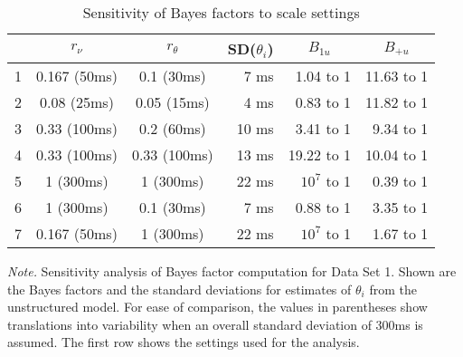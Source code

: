 \documentclass[american,man]{apa6}
\begin{document}
\begin{table}[tbp]
\begin{center}
\begin{threeparttable}
\caption{Sensitivity of Bayes factors to scale settings}
\begin{tabular}{lccrrr}
\toprule
  & \multicolumn{1}{c}{$r_\nu$} & \multicolumn{1}{c}{$r_\theta$} & \multicolumn{1}{c}{SD($\theta_i$)} & \multicolumn{1}{c}{$B_{1u}$} & \multicolumn{1}{c}{$B_{+u}$}\\
\midrule
1 & 0.167 (50ms) & 0.1 (30ms) & 7 ms & 1.04 to 1 & 11.63 to 1\\
2 & 0.08 (25ms) & 0.05 (15ms) & 4 ms & 0.83 to 1 & 11.82 to 1\\
3 & 0.33 (100ms) & 0.2 (60ms) & 10 ms & 3.41 to 1 & 9.34 to 1\\
4 & 0.33 (100ms) & 0.33 (100ms) & 13 ms & 19.22 to 1 & 10.04 to 1\\
5 & 1 (300ms) & 1 (300ms) & 22 ms & $10^7$ to 1 & 0.39 to 1\\
6 & 1 (300ms) & 0.1 (30ms) & 7 ms & 0.88 to 1 & 3.35 to 1\\
7 & 0.167 (50ms) & 1 (300ms) & 22 ms & $10^7$ to 1 & 1.67 to 1\\
\bottomrule
\end{tabular}
\begin{tablenotes}[para]
\textit{Note.} Sensitivity analysis of Bayes factor computation for Data Set 1. Shown are the Bayes factors and the standard deviations for estimates of $\theta_i$ from the unstructured model. For ease of comparison, the values in parentheses show translations into variability when an overall standard deviation of 300ms is assumed. The first row shows the settings used for the analysis.
\end{tablenotes}
\end{threeparttable}
\end{center}
\end{table}
\end{document}
